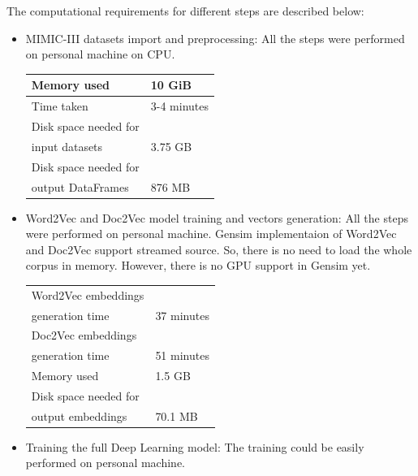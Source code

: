 \documentclass[11pt,a4paper]{article}
\begin{document}
The computational requirements for different steps are described below:
\begin{itemize}
	\item MIMIC-III datasets import and preprocessing: All the steps were performed on personal machine on CPU.
\newline

\begin{small}
\begin{tabular}{ ll }
	\hline
   		Memory used & 10 GiB \\
  	\hline
    		Time taken & 3-4 minutes \\
    \hline
    		Disk space needed for \\ input datasets & 3.75 GB \\
    	\hline
    		Disk space needed for \\ output DataFrames & 876 MB \\		 
  	\hline
\end{tabular}
\end{small}
\newline

	\item Word2Vec and Doc2Vec model training and vectors generation: All the steps were performed on personal machine. Gensim implementaion of Word2Vec and Doc2Vec support streamed source. So, there is no need to load the whole corpus in memory. However, there is no GPU support in Gensim yet.
\newline

\begin{small}
\begin{tabular}{ ll }
	\hline
   		Word2Vec embeddings \\ generation time & 37 minutes \\
  	\hline
    		Doc2Vec embeddings \\ generation time & 51 minutes \\ 
  	\hline
  		Memory used & 1.5 GB \\
  	\hline
  		Disk space needed for \\ output embeddings & 70.1 MB \\
  	\hline
\end{tabular}
\end{small}
\newline
	\item Training the full Deep Learning model: The training could be easily performed on personal machine.
\newline


\end{itemize}
\end{document}
